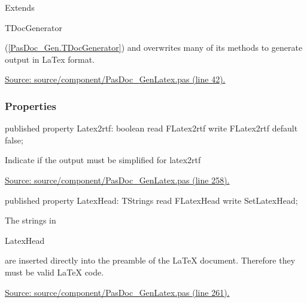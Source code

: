 \documentclass{report}
\newif\ifpdf
\begin{document}
 Extends \begin{ttfamily}TDocGenerator\end{ttfamily}(\ref{PasDoc_Gen.TDocGenerator}) and overwrites many of its methods to generate output in LaTex format.\par
\href{https://github.com/pasdoc/pasdoc/blob/master/source/component/PasDoc_GenLatex.pas#L42}{Source: source/component/PasDoc{\_}GenLatex.pas (line 42).}\subsubsection*{\large{\textbf{Properties}}\normalsize\hspace{1ex}\hfill}
\begin{list}{}{
\setlength{\itemindent}{0cm}
\setlength{\listparindent}{0cm}
\setlength{\leftmargin}{\evensidemargin}
\addtolength{\leftmargin}{\tmplength}
\settowidth{\labelsep}{X}
\addtolength{\leftmargin}{\labelsep}
\setlength{\labelwidth}{\tmplength}
}
\label{PasDoc_GenLatex.TTexDocGenerator-Latex2rtf}
\item[\textbf{Latex2rtf}\hfill]
\ifpdf
\begin{flushleft}
\fi
\begin{ttfamily}
published property Latex2rtf: boolean read FLatex2rtf write FLatex2rtf default false;\end{ttfamily}

\ifpdf
\end{flushleft}
\fi


\par Indicate if the output must be simplified for latex2rtf\par
\href{https://github.com/pasdoc/pasdoc/blob/master/source/component/PasDoc_GenLatex.pas#L258}{Source: source/component/PasDoc{\_}GenLatex.pas (line 258).}\label{PasDoc_GenLatex.TTexDocGenerator-LatexHead}
\item[\textbf{LatexHead}\hfill]
\ifpdf
\begin{flushleft}
\fi
\begin{ttfamily}
published property LatexHead: TStrings read FLatexHead write SetLatexHead;\end{ttfamily}

\ifpdf
\end{flushleft}
\fi


\par The strings in \begin{ttfamily}LatexHead\end{ttfamily} are inserted directly into the preamble of the LaTeX document. Therefore they must be valid LaTeX code.\par
\href{https://github.com/pasdoc/pasdoc/blob/master/source/component/PasDoc_GenLatex.pas#L261}{Source: source/component/PasDoc{\_}GenLatex.pas (line 261).}\end{list}
\end{document}

